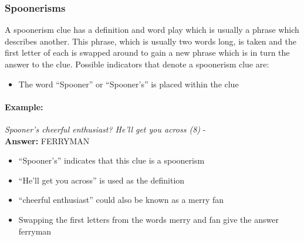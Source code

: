 \subsubsection{Spoonerisms}

A spoonerism clue has a definition and word play which is usually a phrase which
describes another. This phrase, which is usually two words long, is taken and
the first letter of each is swapped around to gain a new phrase which is in turn
the answer to the clue. Possible  indicators that denote a spoonerism clue are:

\begin{itemize} 
    \item The word ``Spooner'' or ``Spooner’s'' is placed within the clue
\end{itemize}

\paragraph{Example:} \emph{Spooner's cheerful enthusiast? He'll get you across (8)} - \citep{connorSpoon12} \\
\textbf{Answer:} FERRYMAN 

\begin{itemize}
    \item ``Spooner’s'' indicates that this clue is a spoonerism 
    \item ``He’ll get you across'' is used as the definition 
    \item ``cheerful enthusiast'' could also be known as a merry fan 
    \item Swapping the first letters from the words merry and fan give the 
    answer ferryman 
\end{itemize}
